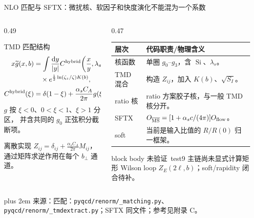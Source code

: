 \documentclass[UTF8,aspectratio=169,11pt]{ctexbeamer}
\newcommand{\source}[1]{%
  \par\vspace{0.02em}\begingroup\fontsize{6}{6.8}\selectfont\raggedright\sloppy
  \setlength{\emergencystretch}{3em}\rightskip=0pt plus 2em
  \color{muted}来源：#1\par\endgroup}
\newcommand{\unverified}{\textcolor{warning}{未验证}}
\newcommand{\dd}{\mathrm{d}}
\begin{document}
\begin{frame}[t]{NLO 匹配与 SFTX：微扰核、软因子和快度演化不能混为一个系数}
  \footnotesize
  \begin{columns}[T,totalwidth=\textwidth]
    \begin{column}{0.49\textwidth}
      \begin{block}{TMD 匹配结构}
        \begin{align*}
          x\widetilde g(x,b)&=\int\frac{\dd y}{|y|}
          C^{\rm hybrid}\!\left(\frac{x}{y},\lambda_s,\frac{\mu}{yP_z}\right)
          \frac{y g(y,b)}{\sqrt{S_I(b,\mu)}}\\[-0.2em]
          &\quad\times e^{\frac12\ln(\zeta_z/\zeta)K(b)},\\
          C^{\rm hybrid}(\xi)&=\delta(1-\xi)
          +\frac{\alpha_s C_A}{2\pi}g(\xi,y).
        \end{align*}
        \(g\) 按 \(\xi<0\)、\(0<\xi<1\)、\(\xi>1\) 分区，
        并含共同的 \(g_0\) 正弦积分截断项。
      \end{block}
      \begin{block}{离散实现}
        \(Z_{ij}=\delta_{ij}+\frac{\alpha_s C_A}{2\pi}M_{ij}\)，
        通过矩阵求逆作用在每个 \(b_\perp\) 通道。
      \end{block}
    \end{column}
    \begin{column}{0.47\textwidth}
      \scriptsize
      \begin{tabularx}{0.94\linewidth}{@{}p{1.25cm}X@{}}
        \toprule
        层次 & 代码职责/物理含义\\
        \midrule
        核函数 & 单圈 \(g_0\)--\(g_3\)，含 \(\operatorname{Si}\)、\(\lambda_s\)。\\
        TMD 混合 & 构造 \(Z_{ij}\)，加入 \(K(b)\)、\(\sqrt{S_I}\)。\\
        ratio 核 & ratio 方案胶子核，与一般 TMD 核分开。\\
        SFTX & \(O_{\overline{\rm MS}}=[1+\alpha_s c/(4\pi)]O_{\rm flow}\)。\\
        soft & 当前是输入比值的 \(R/R(0)\) 归一框架。\\
        \bottomrule
      \end{tabularx}
      \vfill
      \begin{beamercolorbox}[wd=0.98\linewidth,sep=0.28em,rounded=true]{block body}
        \scriptsize\unverified\ test9 主链尚未显式计算矩形 Wilson loop
        \(Z_E(2\ell,b)\)；soft/rapidity 闭合待补。
      \end{beamercolorbox}
    \end{column}
  \end{columns}
  \source{匹配：\nolinkurl{pyqcd/renorm/_matching.py}、\nolinkurl{pyqcd/renorm/_tmdextract.py}；SFTX 同文件；参考见附录 C。}
\end{frame}
\end{document}
